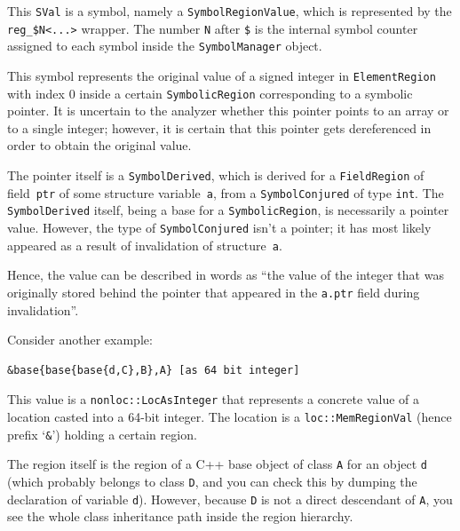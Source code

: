 \documentclass[a4paper,12pt]{article}
\newenvironment{nobr}{\begin{minipage}{\textwidth}\setlength\parskip{1em}
}{\end{minipage}\ignorespacesafterend}
\begin{document}
This \lstinline|SVal| is a symbol, namely a \lstinline|SymbolRegionValue|, which is represented by the \lstinline|reg_$N<...>| wrapper. The number \lstinline|N| after \lstinline|$| is the internal symbol counter assigned to each symbol inside the \lstinline|SymbolManager| object.

This symbol represents the original value of a signed integer in \lstinline|ElementRegion| with index $0$ inside a certain \lstinline|SymbolicRegion| corresponding to a symbolic pointer. It is uncertain to the analyzer whether this pointer points to an array or to a single integer; however, it is certain that this pointer gets dereferenced in order to obtain the original value.

The pointer itself is a \lstinline|SymbolDerived|, which is derived for a \lstinline|FieldRegion| of field~\lstinline|ptr| of some structure variable~\lstinline|a|, from a \lstinline|SymbolConjured| of type \lstinline|int|. The \lstinline|SymbolDerived| itself, being a base for a \lstinline|SymbolicRegion|, is necessarily a pointer value. However, the type of \lstinline|SymbolConjured| isn't a pointer; it has most likely appeared as a result of invalidation of structure~\lstinline|a|.

Hence, the value can be described in words as ``the value of the integer that was originally stored behind the pointer that appeared in the \lstinline|a.ptr| field during invalidation''.

\begin{nobr}
Consider another example:
\begin{lstlisting}[style=commandline]
&base{base{base{d,C},B},A} [as 64 bit integer]
\end{lstlisting}
\end{nobr}

This value is a \lstinline|nonloc::LocAsInteger| that represents a concrete value of a location casted into a 64-bit integer. The location is a \lstinline|loc::MemRegionVal| (hence prefix `\lstinline|&|') holding a certain region.

The region itself is the region of a C++ base object of class \lstinline|A| for an object \lstinline|d| (which probably belongs to class \lstinline|D|, and you can check this by dumping the declaration of variable \lstinline|d|). However, because \lstinline|D| is not a direct descendant of \lstinline|A|, you see the whole class inheritance path inside the region hierarchy.
\end{document}
